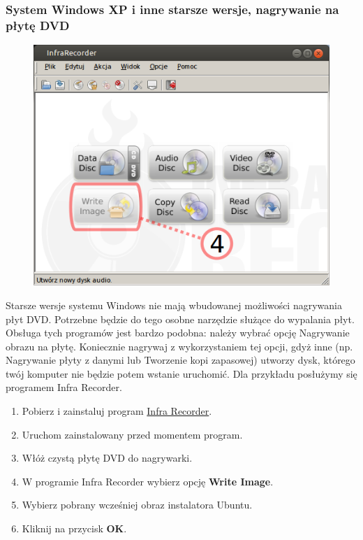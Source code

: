\subsubsection{System Windows XP i inne starsze wersje, nagrywanie na płytę DVD}
\begin{figure}
                \includegraphics[width=\linewidth]{images/instalacja_nagrywanie_obrazu_DVD_winXP.png}
\end{figure}
Starsze wersje systemu Windows nie mają wbudowanej możliwości nagrywania płyt DVD. Potrzebne będzie do tego osobne narzędzie służące do wypalania płyt. Obsługa tych programów jest bardzo podobna: należy wybrać opcję Nagrywanie obrazu na płytę. Koniecznie nagrywaj z wykorzystaniem tej opcji, gdyż inne (np. Nagrywanie płyty z danymi lub Tworzenie kopi zapasowej) utworzy dysk, którego twój komputer nie będzie potem wstanie uruchomić. Dla przykładu posłużymy się programem Infra Recorder.
\begin{enumerate}
\item Pobierz i zainstaluj program \href{http://infrarecorder.org/?page_id=5}{Infra Recorder}.
\item Uruchom zainstalowany przed momentem program.
\item Włóż czystą płytę DVD do nagrywarki.
\item W programie Infra Recorder wybierz opcję \textbf{Write Image}.
\item Wybierz pobrany wcześniej obraz instalatora Ubuntu.
\item Kliknij na przycisk \textbf{OK}.
\end{enumerate}
\clearpage
